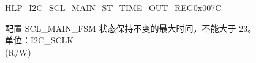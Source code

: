 \begin{register}{H}{LP\_I2C\_SCL\_MAIN\_ST\_TIME\_OUT\_REG}{0x007C}\label{regdesc:LPI2CSCLMAINSTTIMEOUTREG}
%
%
\regnewline%
\begin{regdesc}\begin{reglist}
\label{fielddesc:LPI2CSCLMAINSTTOI2C}\item [LP\_I2C\_SCL\_MAIN\_ST\_TO\_I2C] 配置 SCL\_MAIN\_FSM 状态保持不变的最大时间，不能大于 23。\\
单位：I2C\_SCLK \\ (R/W)
\end{reglist}\end{regdesc}
\end{register}


